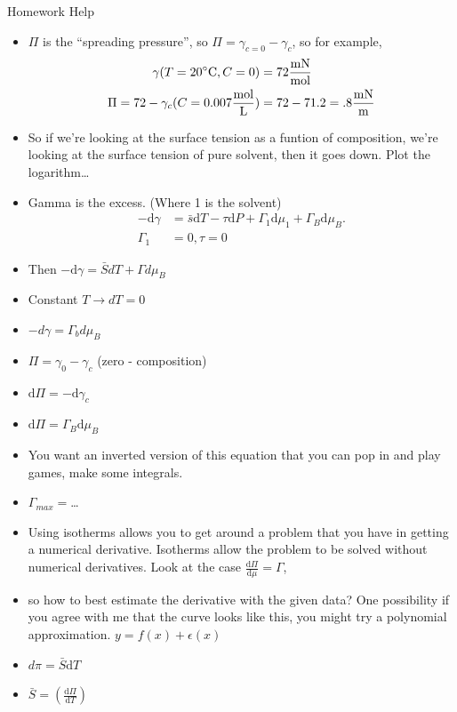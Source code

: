 \documentclass{article}
\renewcommand{\d}[0]{\mathrm{d}}
\newcommand{\dOne}[2]{\frac{\d #1}{\d #2}}
\begin{document}
  \begin{section}{Homework Help}  
    
    \begin{itemize}
      \item $\Pi$ is the ``spreading pressure'', so $\Pi = \gamma_{c=0} - \gamma_c$, so for example, 
	\begin{align}
	  \gamma(T=20 \si{\celsius},C = 0) &= 72\si{\frac{\milli\newton}{\mol}}\\
	  \Pi = 72 - \gamma_c(C=0.007 \frac{\si{mol}}{\si{L}}) &= 72 - 71.2 = .8 \frac{\si{mN}}{\si{m}}
	\end{align}

      \item So if we're looking at the surface tension as a funtion of composition, we're looking at the surface tension of pure solvent, then it goes down. Plot the logarithm\dots

      \item Gamma is the excess. (Where 1 is the solvent) 
	\begin{align*}
	  -\d\gamma &= \bar{s} \d T  - \tau \d P + \Gamma_1 \d\mu_1+ \Gamma_B \d \mu_B. \\
	  \Gamma_1 &= 0, \tau = 0
	\end{align*}
      \item 	Then $-\d \gamma = \bar{S} dT + \Gamma d\mu_B$
      \item Constant $T \rightarrow dT = 0$
      \item $-d\gamma = \Gamma_b d\mu_B$

      \item $\Pi = \gamma_0 - \gamma_c$ (zero - composition)
      \item $\d \Pi = - \d \gamma_c$
      \item $\d \Pi = \Gamma_B \d \mu_B$
      \item You want an inverted version of this equation that you can pop in and play games, make some integrals.

      \item $\Gamma_{max} = $\dots

      \item Using isotherms allows you to get around a problem that you have in getting a numerical derivative. Isotherms allow the problem to be solved without numerical derivatives. Look at the case $\frac{\d \Pi}{\d \mu} = \Gamma$,
      \item so how to best estimate the derivative with the given data? One possibility if you agree with me that the curve looks like this, you might try a polynomial approximation. $y = f(x) + \epsilon(x)$

      \item $d\pi = \bar{S}\d T $
      \item $\bar{S} = (\dOne{\Pi}{T})$
  \end{itemize}



\end{section}
\end{document}
